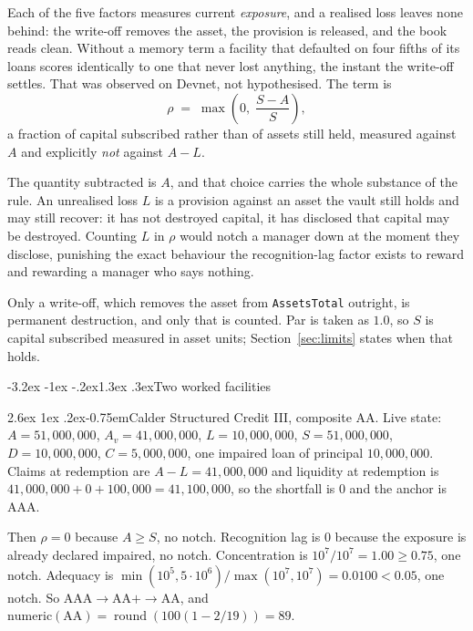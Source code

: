 \documentclass[11pt]{article}
\makeatletter
\renewcommand\subsection{\@startsection{subsection}{2}{\z@}%
  {-3.2ex \@plus -1ex \@minus -.2ex}{1.3ex \@plus .3ex}{\normalfont\large\bfseries}}
\renewcommand\paragraph{\@startsection{paragraph}{4}{\z@}%
  {2.6ex \@plus 1ex \@minus .2ex}{-0.75em}{\normalfont\normalsize\bfseries}}
\theoremstyle{orma}
\theoremstyle{ormaupright}
\DeclareMathOperator{\round}{round}
\makeatother
\begin{document}
Each of the five factors measures current \emph{exposure}, and a realised loss leaves none
behind: the write-off removes the asset, the provision is released, and the book reads
clean. Without a memory term a facility that defaulted on four fifths of its loans scores
identically to one that never lost anything, the instant the write-off settles. That was
observed on Devnet, not hypothesised. The term is
\begin{equation}
  \rho \;=\; \max\left( 0,\; \frac{S - A}{S} \right),
\end{equation}
a fraction of capital subscribed rather than of assets still held, measured against $A$ and
explicitly \emph{not} against $A - L$.

The quantity subtracted is $A$, and that choice carries the whole substance of the rule. An
unrealised loss $L$ is a provision against an asset the vault still holds and may still
recover: it has not destroyed capital, it has disclosed that capital may be destroyed.
Counting $L$ in $\rho$ would notch a manager down at the moment they disclose, punishing the
exact behaviour the recognition-lag factor exists to reward and rewarding a manager who says
nothing.

Only a write-off, which removes the asset from \texttt{AssetsTotal} outright, is
permanent destruction, and only that is counted. Par is taken as $1.0$, so $S$ is capital
subscribed measured in asset units; Section~\ref{sec:limits} states when that holds.

\subsection{Two worked facilities}

\paragraph{Calder Structured Credit III, composite AA.} Live state: $A = 51{,}000{,}000$,
$A_v = 41{,}000{,}000$, $L = 10{,}000{,}000$, $S = 51{,}000{,}000$, $D = 10{,}000{,}000$,
$C = 5{,}000{,}000$, one impaired loan of principal $10{,}000{,}000$. Claims at redemption
are $A - L = 41{,}000{,}000$ and liquidity at redemption is
$41{,}000{,}000 + 0 + 100{,}000 = 41{,}100{,}000$, so the shortfall is $0$ and the anchor is
AAA.

Then $\rho = 0$ because $A \geq S$, no notch. Recognition lag is $0$ because the
exposure is already declared impaired, no notch. Concentration is
$10^{7}/10^{7} = 1.00 \geq 0.75$, one notch. Adequacy is
$\min(10^{5}, 5 \cdot 10^{6}) / \max(10^{7}, 10^{7}) = 0.0100 < 0.05$, one notch. So
$\text{AAA} \rightarrow \text{AA+} \rightarrow \text{AA}$, and
$\mathrm{numeric}(\text{AA}) = \round(100(1 - 2/19)) = 89$.
\end{document}
